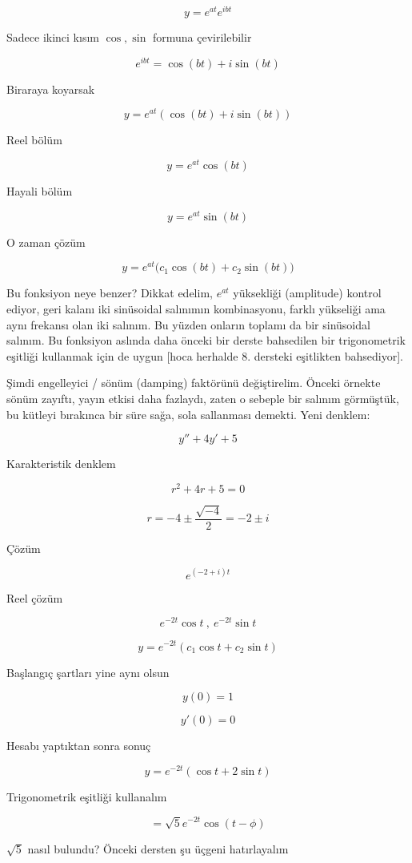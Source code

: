 \documentclass[12pt,fleqn]{article}\usepackage{../../common}
\begin{document}
$$ y = e^{at} e^{ibt} $$

Sadece ikinci kısım $\cos, \sin$ formuna çevirilebilir

$$ e^{ibt} = \cos(bt) + i\sin(bt) $$

Biraraya koyarsak

$$ y = e^{at} (\cos(bt) + i\sin(bt)) $$

Reel bölüm

$$ y = e^{at}\cos(bt) $$ 

Hayali bölüm

$$ y = e^{at}\sin(bt) $$ 

O zaman çözüm

$$ y = e^{at} \bigg( c_1 \cos(bt) + c_2 \sin(bt) \bigg) $$

Bu fonksiyon neye benzer? Dikkat edelim, $e^{at}$ yüksekliği (amplitude)
kontrol ediyor, geri kalanı iki sinüsoidal salınımın kombinasyonu, farklı
yükseliği ama aynı frekansı olan iki salınım. Bu yüzden onların toplamı da
bir sinüsoidal salınım. Bu fonksiyon aslında daha önceki bir derste
bahsedilen bir trigonometrik eşitliği kullanmak için de uygun [hoca
herhalde 8. dersteki eşitlikten bahsediyor].

Şimdi engelleyici / sönüm (damping) faktörünü değiştirelim. Önceki örnekte sönüm
zayıftı, yayın etkisi daha fazlaydı, zaten o sebeple bir salınım görmüştük, bu
kütleyi bırakınca bir süre sağa, sola sallanması demekti. Yeni denklem:

$$ y'' + 4y' + 5 $$

Karakteristik denklem

$$ r^2 + 4r + 5 = 0 $$

$$ r = -4 \pm \frac{\sqrt{-4}}{2} = -2 \pm i$$

Çözüm

$$ e^{(-2+i)t} $$

Reel çözüm

$$ e^{-2t}\cos t \ , \ e^{-2t}\sin t$$

$$ y = e^{-2t} (c_1 \cos t + c_2 \sin t) $$

Başlangıç şartları yine aynı olsun

$$ y(0) = 1 $$

$$ y'(0) = 0 $$

Hesabı yaptıktan sonra sonuç

$$ y = e^{-2t} (\cos t + 2 \sin t) $$

Trigonometrik eşitliği kullanalım

$$ = \sqrt{5}e^{-2t} \cos (t - \phi) $$

$\sqrt{5}$ nasıl bulundu? Önceki dersten şu üçgeni hatırlayalım
\end{document}
